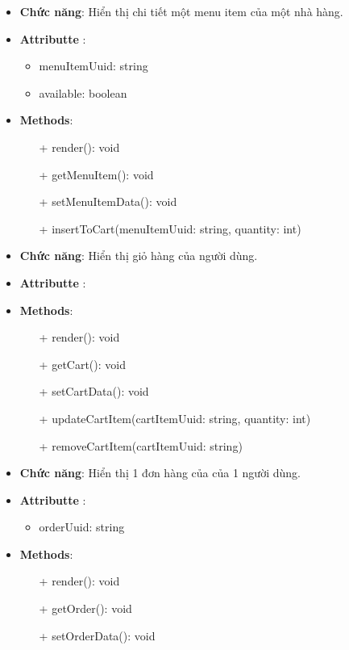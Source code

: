 \begin{itemize}
    \item \textbf{Chức năng}: Hiển thị chi tiết một menu item của một nhà hàng.
    \item \textbf{Attributte} :
    \begin{itemize}
        \item menuItemUuid: string
        \item available: boolean
    \end{itemize}
    \item \textbf{Methods}:
    \begin{itemize}
        \item[+] render(): void
        \item[+] getMenuItem(): void
        \item[+] setMenuItemData(): void
        \item[+] insertToCart(menuItemUuid: string, quantity: int)
    \end{itemize}
\end{itemize}
\begin{itemize}
    \item \textbf{Chức năng}: Hiển thị giỏ hàng của người dùng.
    \item \textbf{Attributte} :
    \item \textbf{Methods}:
    \begin{itemize}
        \item[+] render(): void
        \item[+] getCart(): void
        \item[+] setCartData(): void
        \item[+] updateCartItem(cartItemUuid: string, quantity: int)
        \item[+] removeCartItem(cartItemUuid: string)
    \end{itemize}
\end{itemize}
\begin{itemize}
    \item \textbf{Chức năng}: Hiển thị 1 đơn hàng của của 1 người dùng.
    \item \textbf{Attributte} :
    \begin{itemize}
        \item orderUuid: string
    \end{itemize}
    \item \textbf{Methods}:
    \begin{itemize}
        \item[+] render(): void
        \item[+] getOrder(): void
        \item[+] setOrderData(): void
    \end{itemize}
\end{itemize}
